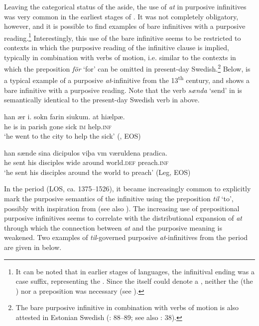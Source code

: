 \documentclass[output=paper]{langscibook}
\begin{document}
Leaving the categorical status of the  aside, the use of \textit{at} in purposive infinitives was very common in the earliest stages of . It was not completely obligatory, however, and it is possible to find examples of bare infinitives with a purposive reading.\footnote{It can be noted that in earlier stages of  languages, the infinitival ending was a case suffix, representing the . Since the  itself could denote a , neither the  (the ) nor a preposition was necessary (see \citealt{Haspelmath1989,Jeffers1975}).} Interestingly, this use of the bare infinitive seems to be restricted to contexts in which the purposive reading of the infinitive clause is implied, typically in combination with verbs of motion, i.e. similar to the contexts in which the preposition \textit{för} ‘for’ can be omitted in present-day Swedish.\footnote{The bare purposive infinitive in combination with verbs of motion is also attested in Estonian Swedish (\citealt{Lagman1958}: 88–89; see also \citealt{Jorgensen1970}: 38).}  Below,  is a typical example of a purposive \textit{at}-infinitive from the 13\textsuperscript{th} century, and  shows a bare infinitive with a purposive reading. Note that the verb \textit{sænda} ‘send’ in  is semantically identical to the present-day Swedish verb in  above.\largerpage

\ea
\label{ex:kalm:9}
\ea \label{ex:kalm:9a}
\gll han ær i. sokn farin siukum. at hiælpæ.\\
 he is in parish gone sick \textsc{im} help.\textsc{inf}\\ 
\glt ‘he went to the city to help the sick’ (, EOS)

\ex \label{ex:kalm:9b}
\gll han sænde sina dicipulos viþa vm væruldena pradica.\\ 
 he sent his disciples wide around world.\textsc{def} preach.\textsc{inf}\\
\glt ‘he sent his disciples around the world to preach’ (Leg, EOS)
\z 
\z 

In the  period (LOS, ca. 1375–1526), it became increasingly common to explicitly mark the purposive semantics of the infinitive using the preposition \textit{til} ‘to’, possibly with inspiration from  (see also ). The increasing use of prepositional purposive infinitives seems to correlate with the distributional expansion of \textit{at} through which the connection between \textit{at} and the purposive meaning is weakened. Two examples of \textit{til}{}-governed purposive \textit{at}{}-infinitives from the  period are given in  below. 
\end{document}
